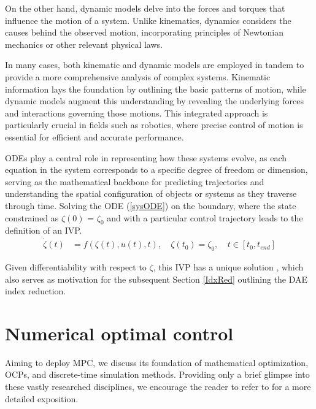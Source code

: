 \par On the other hand, dynamic models delve into the forces and torques that influence the motion of a system. Unlike kinematics, dynamics considers the causes behind the observed motion, incorporating principles of Newtonian mechanics or other relevant physical laws.

\par In many cases, both kinematic and dynamic models are employed in tandem to provide a more comprehensive analysis of complex systems. Kinematic information lays the foundation by outlining the basic patterns of motion, while dynamic models augment this understanding by revealing the underlying forces and interactions governing those motions. This integrated approach is particularly crucial in fields such as robotics, where precise control of motion is essential for efficient and accurate performance.

\par \ac{ODE}s play a central role in representing how these systems evolve, as each equation in the system corresponds to a specific degree of freedom or dimension, serving as the mathematical backbone for predicting trajectories and understanding the spatial configuration of objects or systems as they traverse through time.
Solving the \ac{ODE} (\ref{sysODE}) on the boundary, where the state constrained as $\zeta(0)$ = $\zeta_{0}$ and with a particular control trajectory leads to the definition of an \ac{IVP}.
\begin{align}
    \dot{\zeta}(t) &= f(\zeta(t), u(t), t), &  ~  \zeta(t_{0}) = \zeta_{0}, &  ~  t \in [t_{0}, t_{end}]\label{IVP}
\end{align}
\par Given differentiability with respect to $\zeta$, this \ac{IVP} has a unique solution \cite{gros_numerical_2022}, which also serves as motivation for the subsequent Section \ref{IdxRed} outlining the \ac{DAE} index reduction.


\section{Numerical optimal control}\label{back_opt_control}
Aiming to deploy \ac{MPC}, we discuss its foundation of mathematical optimization, \ac{OCP}s, and discrete-time simulation methods. Providing only a brief glimpse into these vastly researched disciplines, we encourage the reader to refer to \cite[Subject Index C]{rawlings_james_model_2020} for a more detailed exposition.

